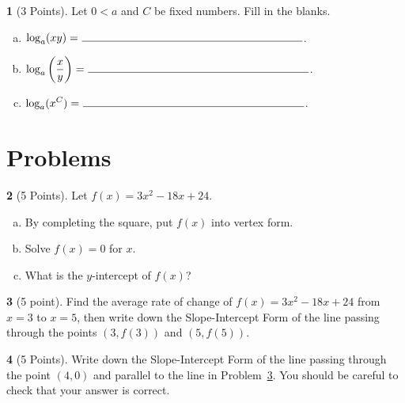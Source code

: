 \documentclass[12pt]{amsart}
\theoremstyle{definition}
\newtheorem{thm}{}
\begin{document}
\begin{thm}[3 Points]
  Let $0 < a$ and $C$ be fixed numbers.  Fill in the blanks.
  \begin{enumerate}[(a)]
  \item
    \vspace{.5in}
    $\displaystyle{\log_a(xy) = \ \line(1,0){200}}$.
    \vspace{.5in}
  \item
    $\displaystyle{\log_a\left(\frac{x}{y}\right) = \ \line(1,0){200}}$.
    \vspace{.5in}
  \item
    $\displaystyle{\log_a(x^C) = \ \line(1,0){200}}$.
  \end{enumerate}
  \vspace{.25in}
\end{thm}

\section{Problems}

\setcounter{thm}{0}
\begin{thm}[5 Points]\label{problem: quadratic}
  Let $f(x) = 3x^2 - 18x + 24.$
  \begin{enumerate}[(a)]
  \item
    By completing the square, put $f(x)$ into vertex form.
    \vspace{2in}
  \item
    Solve $f(x) = 0$ for $x$.
    \vspace{2in}
  \item
    What is the $y$-intercept of $f(x)$?
    \vspace{.5in}
  \end{enumerate}
\end{thm}

\newpage

\begin{thm}[5 point]\label{problem: average rate of change}
  Find the average rate of change of $f(x) = 3x^2 - 18x + 24$ from $x = 3$ to $x = 5$, then write down the Slope-Intercept Form of the line passing through the points $(3,f(3))$ and $(5,f(5))$.
  \vspace{2in}
\end{thm}

\begin{thm}[5 Points]\label{problem: construct tangent line}
  Write down the Slope-Intercept Form of the line passing through the point $(4,0)$ and parallel to the line in Problem~\ref{problem: average rate of change}.
  You should be careful to check that your answer is correct.
  \vspace{2in}
\end{thm}
\end{document}
